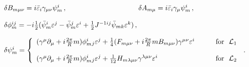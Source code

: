\documentclass[a4paper,12pt]{article}
\def\L{{\cal L}}
\def\pr{{\textstyle{\frac{2\pi}{R}}}}
\begin{document}
\begin{equation}
\begin{array}{cc}
\delta B_{m\mu\nu}=i\bar{\varepsilon}_{i}\gamma_{\mu\nu}\psi_{m}^{i}\,,~~~
&~~~
\delta A_{m\mu}=i\bar{\varepsilon}_{i}\gamma_{\mu}\psi^{i}_{m}\,,\\
{}&{}\\
\multicolumn{2}{l}{\delta\phi^{ij}_{m}=-i\textstyle{\frac{1}{2}}(\bar{\psi}^{i}_{m}\varepsilon^{j}-\bar{\psi}^{j}_{m}\varepsilon^{i}+\textstyle{\frac{1}{2}}J^{-1ij}\bar{\psi}_{mk}\varepsilon^{k})\,,}\\
{}&{}\\
\multicolumn{2}{c}{\delta\psi_{m}^{i}=\left\{\begin{array}{ll}
(\gamma^{\mu}\partial_{\mu}+i\pr m)\phi^{i}_{m}{}_{j}\varepsilon^{j}+
\textstyle{\frac{1}{4}}(F_{m\mu\nu}+i\pr mB_{m\mu\nu})\gamma^{\mu\nu}
\varepsilon^{i}~~~~&~~\mbox{for~~}\L_{1}\\
{}&{}\\
(\gamma^{\mu}\partial_{\mu}+i\pr m)\phi^{i}_{m}{}_{j}\varepsilon^{j}
+\textstyle{\frac{1}{12}}
H_{m\lambda\mu\nu}\gamma^{\lambda\mu\nu}\varepsilon^{i}~~~~&~~\mbox{for~~}\L_{2}
\end{array}\right. \,.}
\end{array}
\label{susy2}
\end{equation}


\end{document}
